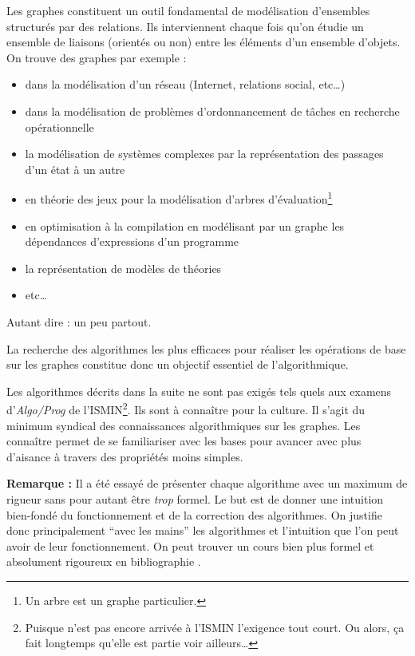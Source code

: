 \documentclass[../../../main.tex]{subfiles}
\begin{document}
Les graphes constituent un outil fondamental de modélisation d'ensembles structurés par des relations. Ils interviennent chaque fois qu'on étudie un ensemble de liaisons (orientés ou non) entre les éléments d'un ensemble d'objets. On trouve des graphes par exemple :
\begin{itemize}
	\item dans la modélisation d'un réseau (Internet, relations social, etc\dots)
	\item dans la modélisation de problèmes d'ordonnancement de tâches en recherche opérationnelle
	\item la modélisation de systèmes complexes par la représentation des passages d'un état à un autre
	\item en théorie des jeux pour la modélisation d'arbres d'évaluation\footnote{Un arbre est un graphe particulier.}
	\item en optimisation à la compilation en modélisant par un graphe les dépendances d'expressions d'un programme
	\item la représentation de modèles de théories
	\item etc\dots
\end{itemize}
Autant dire : un peu partout.

La recherche des algorithmes les plus efficaces pour réaliser les opérations de base sur les graphes constitue donc un objectif essentiel de l’algorithmique.

Les algorithmes décrits dans la suite ne sont pas exigés tels quels aux examens d'\textit{Algo/Prog} de l'ISMIN\footnote{Puisque n'est pas encore arrivée à l'ISMIN l'exigence tout court. Ou alors, ça fait longtemps qu'elle est partie voir ailleurs\dots}. Ils sont à connaître pour la culture. Il s'agit du minimum syndical des connaissances algorithmiques sur les graphes. Les connaître permet de se familiariser avec les bases pour avancer avec plus d'aisance à travers des propriétés moins simples.

\textbf{Remarque :} Il a été essayé de présenter chaque algorithme avec un maximum de rigueur sans pour autant être \textit{trop} formel. Le but est de donner une intuition bien-fondé du fonctionnement et de la correction des algorithmes. On justifie donc principalement ``avec les mains'' les algorithmes et l'intuition que l'on peut avoir de leur fonctionnement. On peut trouver un cours bien plus formel et absolument rigoureux en bibliographie \cite{ENSGraphes}.
\end{document}
